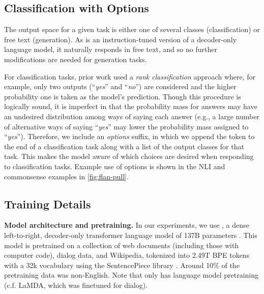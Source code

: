 \subsection{Classification with Options}\label{subsec:options}
\vspace{-1mm}
The output space for a given task is either one of several classes (classification) or free text (generation). 
As \flan{} is an instruction-tuned version of a decoder-only language model, it naturally responds in free text, and so no further modifications are needed for generation tasks.

For classification tasks, prior work \citep{brown2020language} used a \textit{rank classification} approach where, for example, only two outputs (``\textit{yes}'' and ``\textit{no}'') are considered and the higher probability one is taken as the model's prediction.
Though this procedure is logically sound, it is imperfect in that the probability mass for answers may have an undesired distribution among ways of saying each answer (e.g., a large number of alternative ways of saying ``\textit{yes}'' may lower the probability mass assigned to ``\textit{yes}'').
Therefore, we include an \textit{options} suffix, in which we append the token  to the end of a classification task along with a list of the output classes for that task.
This makes the model aware of which choices are desired when responding to classification tasks.
Example use of options is shown in the NLI and commonsense examples in \cref{fig:flan-pull}.

\vspace{-1mm}
\subsection{Training Details}
\vspace{-1mm}

\textbf{Model architecture and pretraining.} 
In our experiments, we use \baselm{}, a dense left-to-right, decoder-only transformer language model of 137B parameters \citep{thoppilan2022lamda}.
This model is pretrained on a collection of web documents (including those with computer code), dialog data, and Wikipedia, tokenized into 2.49T BPE tokens with a 32k vocabulary using the SentencePiece library \citep{sentencepiece}. 
Around 10\% of the pretraining data was non-English.
Note that \baselm{} only has language model pretraining (c.f. LaMDA, which was finetuned for dialog).

